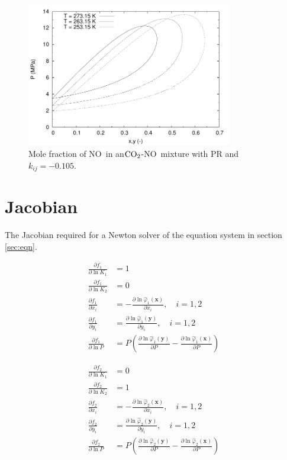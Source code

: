 \documentclass[english]{../thermomemo/thermomemo}
\newcommand*{\pd}[2]{\ensuremath{\frac{\partial #1}{\partial{#2}}}}
\newcommand{\coto}{\ensuremath{\text{CO}_{\text{\scriptsize 2}}}}
\newcommand{\no}{\ensuremath{\text{NO}}}
\begin{document}
\begin{figure}[tbp]
  \centering
  \includegraphics[width=0.8\textwidth]{NO_PR_Txy.pdf}
  \caption{Mole fraction of \no~in an\coto-\no~mixture with PR and $k_{ij}=-0.105$.}
  \label{fig:pr_opt}
\end{figure}

\appendix

\section{Jacobian}
The Jacobian required for a Newton solver of the equation system in
section \ref{sec:eqn}.

\begin{align}
 \pd{f_1}{\ln K_1}  & = 1 \\
 \pd{f_1}{\ln K_2}  & = 0 \\
 \pd{f_1}{x_i}  & =  - \pd{\ln
 \hat{\varphi}_1\left(\mathbf{x}\right)}{x_i}, \quad
 i=1,2\\
 \pd{f_1}{y_i}  & =  \pd{\ln
 \hat{\varphi}_1\left(\mathbf{y}\right)}{y_i}, \quad
 i=1,2\\
 \pd{f_1}{\ln P}  & =  P\left(\pd{\ln
 \hat{\varphi}_1\left(\mathbf{y}\right)}{P} -\pd{\ln
 \hat{\varphi}_1\left(\mathbf{x}\right)}{P}\right)
\end{align}

\begin{align}
 \pd{f_2}{\ln K_1}  & = 0 \\
 \pd{f_2}{\ln K_2}  & = 1 \\
 \pd{f_2}{x_i}  & =  - \pd{\ln
 \hat{\varphi}_2\left(\mathbf{x}\right)}{x_i}, \quad
 i=1,2\\
 \pd{f_2}{y_i}  & =  \pd{\ln
 \hat{\varphi}_2\left(\mathbf{y}\right)}{y_i}, \quad
 i=1,2\\
 \pd{f_2}{\ln P}  & =  P\left(\pd{\ln
 \hat{\varphi}_2\left(\mathbf{y}\right)}{P} -\pd{\ln
 \hat{\varphi}_2\left(\mathbf{x}\right)}{P}\right)
\end{align}
\end{document}
